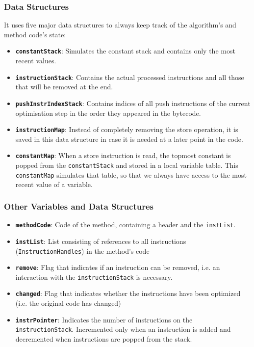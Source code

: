 \subsubsection{Data Structures}
It uses five major data structures to always keep track of the algorithm's and method code's state:

\begin{itemize}
\item \textbf{\texttt{constantStack}}: Simulates the constant stack and contains only the most recent values.
\item \textbf{\texttt{instructionStack}}: Contains the actual processed instructions and all those that will be removed at the end.
\item \textbf{\texttt{pushInstrIndexStack}}: Contains indices of all push instructions of the current optimisation step in the order they appeared in the bytecode.
\item \textbf{\texttt{instructionMap}}: Instead of completely removing the store operation, it is saved in this data structure in case it is needed at a later point in the code.
\item \textbf{\texttt{constantMap}}: When a store instruction is read, the topmost constant is popped from the \texttt{\texttt{constantStack}} and stored in a local variable table. This \texttt{constantMap} simulates that table, so that we always have access to the most recent value of a variable.
\end{itemize}

\subsubsection{Other Variables and Data Structures}
\begin{itemize}
\item \textbf{\texttt{methodCode}}: Code of the method, containing a header and the \texttt{instList}.
\item \textbf{\texttt{instList}}: List consisting of references to all instructions (\texttt{InstructionHandles}) in the method's code
\item \textbf{\texttt{remove}}: Flag that indicates if an instruction can be removed, i.e. an interaction with the \texttt{instructionStack} is necessary.
\item \textbf{\texttt{changed}}: Flag that indicates whether the instructions have been optimized (i.e. the original code has changed) 
\item \textbf{\texttt{instrPointer}}: Indicates the number of instructions on the \texttt{instructionStack}. Incremented only when an instruction is added and decremented when instructions are popped from the stack.
\end{itemize}

